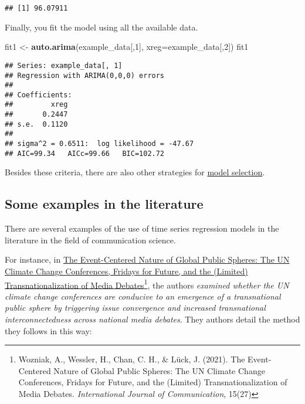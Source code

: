 \documentclass[
]{article}
\newenvironment{Shaded}{\begin{snugshade}}{\end{snugshade}}
\newcommand{\AttributeTok}[1]{\textcolor[rgb]{0.13,0.29,0.53}{#1}}
\newcommand{\DecValTok}[1]{\textcolor[rgb]{0.00,0.00,0.81}{#1}}
\newcommand{\FunctionTok}[1]{\textcolor[rgb]{0.13,0.29,0.53}{\textbf{#1}}}
\newcommand{\NormalTok}[1]{#1}
\newcommand{\OtherTok}[1]{\textcolor[rgb]{0.56,0.35,0.01}{#1}}
\begin{document}
\begin{verbatim}
## [1] 96.07911
\end{verbatim}

Finally, you fit the model using all the available data.

\begin{Shaded}
\begin{Highlighting}[]
\NormalTok{fit1 }\OtherTok{\textless{}{-}} \FunctionTok{auto.arima}\NormalTok{(example\_data[,}\DecValTok{1}\NormalTok{], }\AttributeTok{xreg=}\NormalTok{example\_data[,}\DecValTok{2}\NormalTok{])}
\NormalTok{fit1}
\end{Highlighting}
\end{Shaded}

\begin{verbatim}
## Series: example_data[, 1] 
## Regression with ARIMA(0,0,0) errors 
## 
## Coefficients:
##         xreg
##       0.2447
## s.e.  0.1120
## 
## sigma^2 = 0.6511:  log likelihood = -47.67
## AIC=99.34   AICc=99.66   BIC=102.72
\end{verbatim}

Besides these criteria, there are also other strategies for \href{https://en.wikipedia.org/wiki/Model_selection}{model selection}.

\subsection{Some examples in the literature}\label{some-examples-in-the-literature}

There are several examples of the use of time series regression models in the literature in the field of communication science.

For instance, in \href{https://ijoc.org/index.php/ijoc/article/viewFile/14843/3344}{The Event-Centered Nature of Global Public Spheres: The UN Climate Change Conferences, Fridays for Future, and the (Limited) Transnationalization of Media Debates}\footnote{Wozniak, A., Wessler, H., Chan, C. H., \& Lück, J. (2021). The Event-Centered Nature of Global Public Spheres: The UN Climate Change Conferences, Fridays for Future, and the (Limited) Transnationalization of Media Debates. \emph{International Journal of Communication}, 15(27)}, the authors \emph{examined whether the UN climate change conferences are conducive to an emergence of a transnational public sphere by triggering issue convergence and increased transnational interconnectedness across national media debates}. They authors detail the method they follows in this way:
\end{document}
